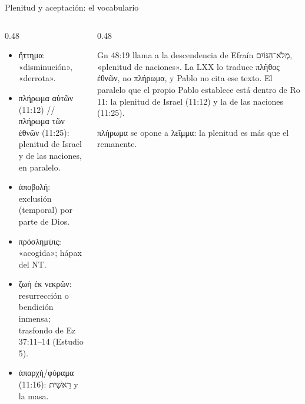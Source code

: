 \documentclass[hyperref={bookmarks=false},aspectratio=169]{beamer}
\newcommand{\heb}[1]{\mbox{\foreignlanguage{hebrew}{#1}}}
\newcommand{\grc}[1]{\foreignlanguage{ancientgreek}{#1}}
\begin{document}
\begin{frame}{Plenitud y aceptación: el vocabulario}
\begin{columns}[T,onlytextwidth]
\begin{column}{0.48\textwidth}\small\RaggedRight
\begin{itemize}
\item \grc{ἥττημα}: «disminución», «derrota».
\item \grc{πλήρωμα αὐτῶν} (11:12) // \grc{πλήρωμα τῶν ἐθνῶν} (11:25): plenitud de Israel y de las naciones, en paralelo.
\item \grc{ἀποβολή}: exclusión (temporal) por parte de Dios.
\item \grc{πρόσλημψις}: «acogida»; hápax del NT.
\item \grc{ζωὴ ἐκ νεκρῶν}: resurrección o bendición inmensa; trasfondo de Ez 37:11--14 (Estudio 5).
\item \grc{ἀπαρχή}/\grc{φύραμα} (11:16): \heb{רֵאשִׁית} y la masa.
\end{itemize}
\end{column}
\begin{column}{0.48\textwidth}
\begin{notalam}
Gn 48:19 llama a la descendencia de Efraín \heb{מְלֹא־הַגּוֹיִם}, «plenitud de naciones». La LXX lo traduce \grc{πλῆθος ἐθνῶν}, no \grc{πλήρωμα}, y Pablo no cita ese texto. El paralelo que el propio Pablo establece está dentro de Ro 11: la plenitud de Israel (11:12) y la de las naciones (11:25).
\end{notalam}
\begin{clave}\grc{πλήρωμα} se opone a \grc{λεῖμμα}: la plenitud es más que el remanente.\end{clave}
\end{column}
\end{columns}
\end{frame}
\end{document}
